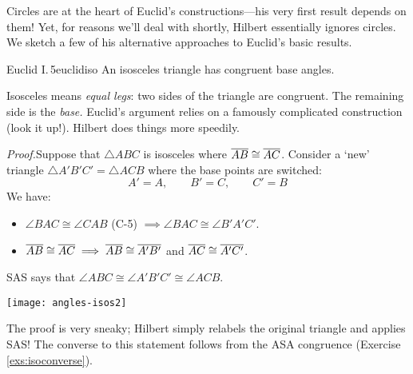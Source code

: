 \goodbreak



Circles are at the heart of Euclid's constructions---his very first result depends on them! Yet, for reasons we'll deal with shortly, Hilbert essentially ignores circles. We sketch a few of his alternative approaches to Euclid's basic results.

\begin{thm}{Euclid I.\,5}{euclidiso}
An isosceles triangle has congruent base angles.
\end{thm}

Isosceles means \emph{equal legs}: two sides of the triangle are congruent. The remaining side is the \emph{base.}\smallbreak
Euclid's argument relies on a famously complicated construction (look it up!). Hilbert does things more speedily.

\begin{tcolorbox}[proofstyle]
\begin{minipage}[t]{0.7\linewidth}\vspace{0pt}
\emph{Proof.}\lstsp Suppose that $\triangle ABC$ is isosceles where $\overline{AB}\cong\overline{AC}$. Consider a `new' triangle $\triangle A'B'C'=\triangle ACB$ where the base points are switched:
\[A'=A,\qquad B'=C,\qquad C'=B\]
We have:
\begin{itemize}
  \item $\angle BAC\cong\angle CAB$ (C-5) $\implies\angle BAC\cong\angle B'A'C'$.
  \item $\overline{AB}\cong\overline{AC}\implies \overline{AB}\cong\overline{A'B'}$ and $\overline{AC}\cong\overline{A'C'}$.
\end{itemize}
SAS says that $\angle ABC\cong\angle A'B'C'\cong\angle ACB$.
\end{minipage}\hfill\begin{minipage}[t]{0.29\linewidth}\vspace{0pt}
\flushright\texttt{[image: angles-isos2]}\\[-8pt]
\hfill\qedsymbol
\end{minipage}
\end{tcolorbox}


The proof is very sneaky; Hilbert simply relabels the original triangle and applies SAS! The converse to this statement follows from the ASA congruence (Exercise \ref{exs:isoconverse}).\bigbreak



